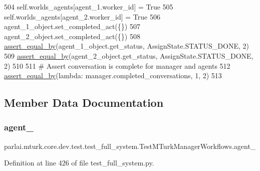 \begin{DoxyCode}
504         self.worlds\_agents[agent\_1.worker\_id] = \textcolor{keyword}{True}
505         self.worlds\_agents[agent\_2.worker\_id] = \textcolor{keyword}{True}
506         agent\_1\_object.set\_completed\_act(\{\})
507         agent\_2\_object.set\_completed\_act(\{\})
508         \hyperlink{namespaceparlai_1_1mturk_1_1core_1_1test_1_1test__full__system_a0b463246d35658a2e422010f13dcf819}{assert\_equal\_by}(agent\_1\_object.get\_status, AssignState.STATUS\_DONE, 2)
509         \hyperlink{namespaceparlai_1_1mturk_1_1core_1_1test_1_1test__full__system_a0b463246d35658a2e422010f13dcf819}{assert\_equal\_by}(agent\_2\_object.get\_status, AssignState.STATUS\_DONE, 2)
510 
511         \textcolor{comment}{# Assert conversation is complete for manager and agents}
512         \hyperlink{namespaceparlai_1_1mturk_1_1core_1_1test_1_1test__full__system_a0b463246d35658a2e422010f13dcf819}{assert\_equal\_by}(\textcolor{keyword}{lambda}: manager.completed\_conversations, 1, 2)
513 
\end{DoxyCode}


\subsection{Member Data Documentation}
\mbox{\label{classparlai_1_1mturk_1_1core_1_1dev_1_1test_1_1test__full__system_1_1TestMTurkManagerWorkflows_abffb036c95f2b09e9582fcc9e8c4fae1}} 
\subsubsection{\texorpdfstring{agent\+\_}{agent\_1}}
{\footnotesize\ttfamily parlai.\+mturk.\+core.\+dev.\+test.\+test\+\_\+full\+\_\+system.\+Test\+M\+Turk\+Manager\+Workflows.\+agent\+\_}



Definition at line 426 of file test\+\_\+full\+\_\+system.\+py.

